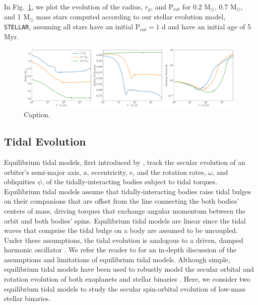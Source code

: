 \documentclass[twocolumn]{aastex61}
\newcommand{\stellar}[0]{\texttt{STELLAR}\xspace}
\begin{document}
In Fig.~\ref{fig:stellarExample}, we plot the evolution of the radius, $r_g$, and P$_{rot}$ for 0.2 M$_{\odot}$, 0.7 M$_{\odot}$, and 1 M$_{\odot}$ mass stars computed according to our stellar evolution model, \stellar, assuming all stars have an initial P$_{rot} = 1$ d and have an initial age of 5 Myr.

\begin{figure}[h]
	\includegraphics[width=\textwidth]{../Plots/stellarExample.pdf}
   \caption{Caption.}%
    \label{fig:stellarExample}%
\end{figure}

\subsection{Tidal Evolution} \label{sec:methods:eqtide}

 Equilibrium tidal models, first introduced by \citep{Darwin1880}, track the secular evolution of an orbiter's semi-major axis, $a$, eccentricity, $e$, and the rotation rates, $\omega$, and obliquities $\psi$, of the tidally-interacting bodies subject to tidal torques. Equilibrium tidal models assume that tidally-interacting bodies raise tidal bulges on their companions that are offset from the line connecting the both bodies' centers of mass, driving torques that exchange angular momentum between the orbit and both bodies' spins. Equilibrium tidal models are linear since the tidal waves that comprise the tidal bulge on a body are assumed to be uncoupled. Under these assumptions, the tidal evolution is analogous to a driven, damped harmonic oscillator \citep{Greenberg2009}.  We refer the reader to \citet{Barnes2017} for an in-depth discussion of the assumptions and limitations of equilibrium tidal models.  Although simple, equilibrium tidal models have been used to robustly model the secular orbital and rotation evolution of both exoplanets \citet[e.g.][]{Goldreich1966,Jackson2009,Leconte2010,Heller2011,Barnes2013,Barnes2017} and stellar binaries \citep[e.g.][]{Repetto2014,Fleming2018}.  Here, we consider two equilibrium tidal models to study the secular spin-orbital evolution of low-mass stellar binaries.  
\end{document}
